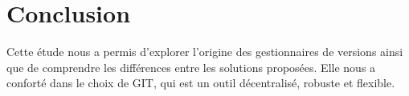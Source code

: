 

\section*{Conclusion}

Cette étude nous a permis d'explorer l'origine des gestionnaires de versions ainsi que de comprendre les différences entre les solutions proposées. Elle nous a conforté dans le choix de GIT, qui est un outil décentralisé, robuste et flexible. 


